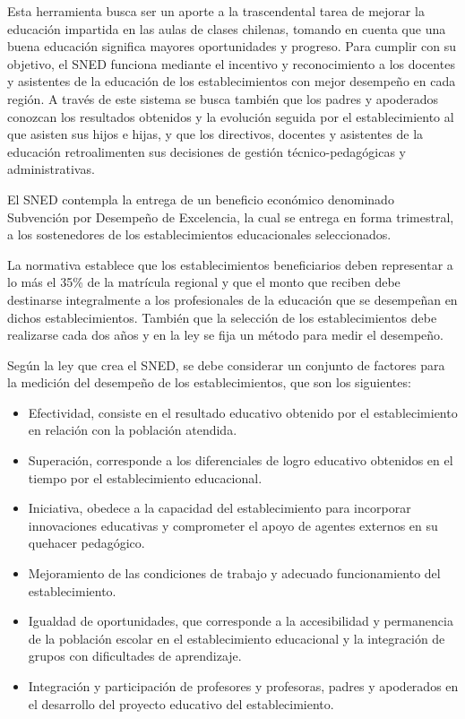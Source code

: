 Esta herramienta busca ser un aporte a la trascendental tarea de mejorar la educación impartida en las aulas de clases chilenas, tomando en cuenta que una buena educación significa mayores oportunidades y progreso. Para cumplir con su objetivo, el SNED funciona mediante el incentivo y reconocimiento a los docentes y asistentes de la educación de los establecimientos con mejor desempeño en cada región. A través de este sistema se busca también que los padres y apoderados conozcan los resultados obtenidos y la evolución seguida por el establecimiento al que asisten sus hijos e hijas, y que los directivos, docentes y asistentes de la educación retroalimenten sus decisiones de gestión técnico-pedagógicas y administrativas.

El SNED contempla la entrega de un beneficio económico denominado Subvención por Desempeño de Excelencia, la cual se entrega en forma trimestral, a los sostenedores de los establecimientos educacionales seleccionados.

La normativa establece que los establecimientos beneficiarios deben representar a lo más el 35\% de la matrícula regional y que el monto que reciben debe destinarse integralmente a los profesionales de la educación que se desempeñan en dichos establecimientos. También que la selección de los establecimientos debe realizarse cada dos años y en la ley se fija un método para medir el desempeño.

Según la ley que crea el SNED, se debe considerar un conjunto de factores para la medición del desempeño de los establecimientos, que son los siguientes:

\begin{itemize}
    \item Efectividad, consiste en el resultado educativo obtenido por el establecimiento en relación con la población atendida.
    \item Superación, corresponde a los diferenciales de logro educativo obtenidos en el tiempo por el establecimiento educacional.
    \item Iniciativa, obedece a la capacidad del establecimiento para incorporar innovaciones educativas y comprometer el apoyo de agentes externos en su quehacer pedagógico.
    \item Mejoramiento de las condiciones de trabajo y adecuado funcionamiento del establecimiento.
    \item Igualdad de oportunidades, que corresponde a la accesibilidad y permanencia de la población escolar en el establecimiento educacional y la integración de grupos con dificultades de aprendizaje.
    \item Integración y participación de profesores y profesoras, padres y apoderados en el desarrollo del proyecto educativo del establecimiento.
\end{itemize}

